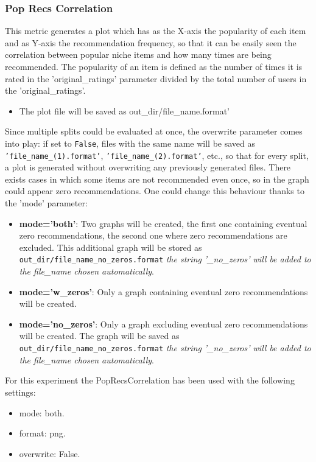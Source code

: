 \documentclass[11pt]{article}
\begin{document}
\subsubsection{Pop Recs Correlation}\label{subsubsec:poprc}
This metric generates a plot which has as the X-axis the popularity of each item and as Y-axis the recommendation
frequency, so that it can be easily seen the correlation between popular niche items and how many times are being
recommended.
The popularity of an item is defined as the number of times it is rated in the 'original\_ratings' parameter
divided by the total number of users in the 'original\_ratings'.
\begin{itemize}
    \item The plot file will be saved as out\_dir/file\_name.format'
\end{itemize}
\hfill\break
\hfill\break
Since multiple splits could be evaluated at once, the overwrite parameter comes into play: if set to \texttt{False},
files with the same name will be saved as \texttt{'file\_name\_(1).format'}, \texttt{'file\_name\_(2).format'}, etc.,
so that for every split, a plot is generated without overwriting any previously generated files.
\hfill\break
\hfill\break
There exists cases in which some items are not recommended even once, so in the graph could appear
zero recommendations. One could change this behaviour thanks to the 'mode' parameter:
\begin{itemize}
    \item \textbf{mode='both'}: Two graphs will be created, the first one containing eventual zero recommendations, the
      second one where zero recommendations are excluded. This additional graph will be stored as
      \texttt{out\_dir/file\_name\_no\_zeros.format} \textit{the string '\_no\_zeros' will be added to the file\_name chosen automatically}.
    \item \textbf{mode='w\_zeros'}: Only a graph containing eventual zero recommendations will be created.
    \item \textbf{mode='no\_zeros'}: Only a graph excluding eventual zero recommendations will be created. The graph will be
      saved as \texttt{out\_dir/file\_name\_no\_zeros.format} \textit{the string '\_no\_zeros' will be added to the file\_name chosen automatically}.
\end{itemize}
\hfill\break
\hfill\break
For this experiment the PopRecsCorrelation has been used with the following settings:
\begin{itemize}
    \item mode: both.
    \item format: png.
    \item overwrite: False.
\end{itemize}
\hfill\break
\hfill\break
\end{document}
